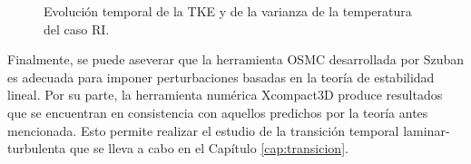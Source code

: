 \begin{figure}[H]
 \centering
 \caption{Evolución temporal de la TKE y de la varianza de la temperatura del caso RI.} 
 \label{fig:Ra65R-DI}
\end{figure}

Finalmente, se puede aseverar que la herramienta OSMC desarrollada por Szuban \linebreak \cite{szuban2023} es adecuada para imponer perturbaciones basadas en la teoría de estabilidad lineal. Por su parte, la herramienta numérica Xcompact3D produce resultados que se encuentran en consistencia con aquellos predichos por la teoría antes mencionada. Esto permite realizar el estudio de la transición temporal laminar-turbulenta que se lleva a cabo en el Capítulo \ref{cap:transicion}.
